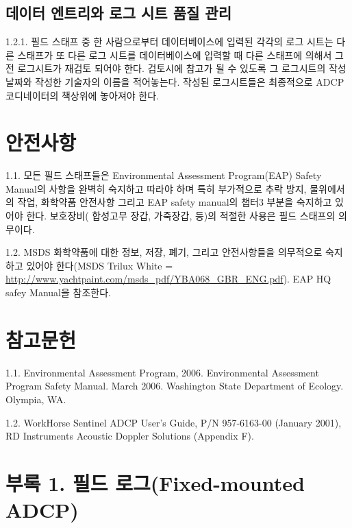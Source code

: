 \documentclass[
]{book}
\begin{document}
\hypertarget{uxb370uxc774uxd130-uxc5d4uxd2b8uxb9acuxc640-uxb85cuxadf8-uxc2dcuxd2b8-uxd488uxc9c8-uxad00uxb9ac}{%
\subsection{데이터 엔트리와 로그 시트 품질 관리}\label{uxb370uxc774uxd130-uxc5d4uxd2b8uxb9acuxc640-uxb85cuxadf8-uxc2dcuxd2b8-uxd488uxc9c8-uxad00uxb9ac}}

1.2.1. 필드 스태프 중 한 사람으로부터 데이터베이스에 입력된 각각의 로그 시트는 다른 스태프가 또 다른 로그 시트를 데이터베이스에 입력할 때 다른 스태프에 의해서 그 전 로그시트가 재검토 되어야 한다. 검토시에 참고가 될 수 있도록 그 로그시트의 작성날짜와 작성한 기술자의 이름을 적어놓는다. 작성된 로그시트들은 최종적으로 ADCP 코디네이터의 책상위에 놓아져야 한다.

\hypertarget{uxc548uxc804uxc0acuxd56d}{%
\section{안전사항}\label{uxc548uxc804uxc0acuxd56d}}

1.1. 모든 필드 스태프들은 Environmental Assessment Program(EAP) Safety Manual의 사항을 완벽히 숙지하고 따라야 하며 특히 부가적으로 추락 방지, 물위에서의 작업, 화학약품 안전사항 그리고 EAP safety manual의 챕터3 부분을 숙지하고 있어야 한다. 보호장비( 합성고무 장갑, 가죽장갑, 등)의 적절한 사용은 필드 스태프의 의무이다.

1.2. MSDS 화학약품에 대한 정보, 저장, 폐기, 그리고 안전사항들을 의무적으로 숙지하고 있어야 한다(MSDS Trilux White = \url{http://www.yachtpaint.com/msds_pdf/YBA068_GBR_ENG.pdf}). EAP HQ safey Manual을 참조한다.

\hypertarget{uxcc38uxace0uxbb38uxd5cc-4}{%
\section{참고문헌}\label{uxcc38uxace0uxbb38uxd5cc-4}}

1.1. Environmental Assessment Program, 2006. Environmental Assessment Program Safety Manual. March 2006. Washington State Department of Ecology. Olympia, WA.

1.2. WorkHorse Sentinel ADCP User's Guide, P/N 957-6163-00 (January 2001), RD Instruments Acoustic Doppler Solutions (Appendix F).

\hypertarget{uxbd80uxb85d-1.-uxd544uxb4dc-uxb85cuxadf8fixed-mounted-adcp}{%
\section{부록 1. 필드 로그(Fixed-mounted ADCP)}\label{uxbd80uxb85d-1.-uxd544uxb4dc-uxb85cuxadf8fixed-mounted-adcp}}
\end{document}

